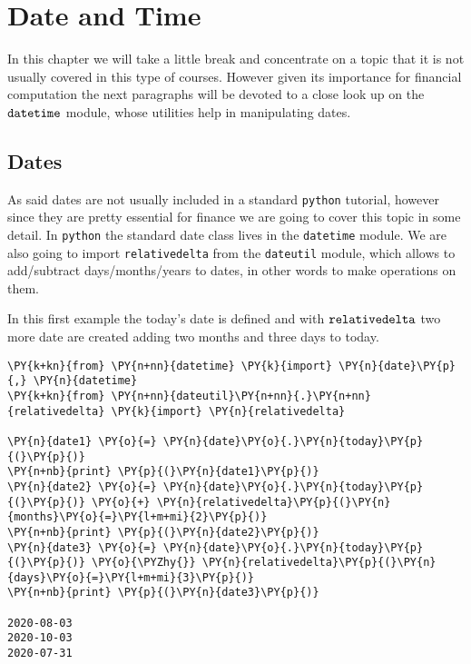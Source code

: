 \chapter{Date and Time}\label{introduction-to-python---lesson-1.6}

In this chapter we will take a little break and concentrate on a topic that it is not usually covered in this type of courses. However given its importance for financial computation the next paragraphs will be devoted to a close look up on the $\tt{datetime}$ module, whose utilities help in manipulating dates.

\section{Dates}\label{dates}

As said dates are not usually included in a standard \texttt{python} tutorial, however since they are pretty essential for finance we are going to cover this topic in some detail. In \texttt{python} the standard date class lives in the \texttt{datetime} module. We are also going to import \texttt{relativedelta} from the \texttt{dateutil} module, which allows to add/subtract days/months/years to dates, in other words to make operations on them.

In this first example the today's date is defined and with $\tt{relativedelta}$ two more date are created adding two months and three days to today.

\begin{tcolorbox}[breakable, size=fbox, boxrule=1pt, pad at break*=1mm,colback=cellbackground, colframe=cellborder]
\begin{Verbatim}[commandchars=\\\{\}]
\PY{k+kn}{from} \PY{n+nn}{datetime} \PY{k}{import} \PY{n}{date}\PY{p}{,} \PY{n}{datetime}
\PY{k+kn}{from} \PY{n+nn}{dateutil}\PY{n+nn}{.}\PY{n+nn}{relativedelta} \PY{k}{import} \PY{n}{relativedelta}

\PY{n}{date1} \PY{o}{=} \PY{n}{date}\PY{o}{.}\PY{n}{today}\PY{p}{(}\PY{p}{)}
\PY{n+nb}{print} \PY{p}{(}\PY{n}{date1}\PY{p}{)}
\PY{n}{date2} \PY{o}{=} \PY{n}{date}\PY{o}{.}\PY{n}{today}\PY{p}{(}\PY{p}{)} \PY{o}{+} \PY{n}{relativedelta}\PY{p}{(}\PY{n}{months}\PY{o}{=}\PY{l+m+mi}{2}\PY{p}{)}
\PY{n+nb}{print} \PY{p}{(}\PY{n}{date2}\PY{p}{)}
\PY{n}{date3} \PY{o}{=} \PY{n}{date}\PY{o}{.}\PY{n}{today}\PY{p}{(}\PY{p}{)} \PY{o}{\PYZhy{}} \PY{n}{relativedelta}\PY{p}{(}\PY{n}{days}\PY{o}{=}\PY{l+m+mi}{3}\PY{p}{)}
\PY{n+nb}{print} \PY{p}{(}\PY{n}{date3}\PY{p}{)}

2020-08-03
2020-10-03
2020-07-31
\end{Verbatim}
\end{tcolorbox}

